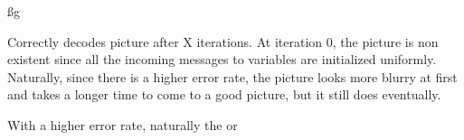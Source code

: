 \ss g

Correctly decodes picture after X iterations. At iteration 0, the picture is non existent since all the incoming messages to variables are initialized uniformly. Naturally, since there is a higher error rate, the picture looks more blurry at first and takes a longer time to come to a good picture, but it still does eventually.

With a higher error rate, naturally the or



